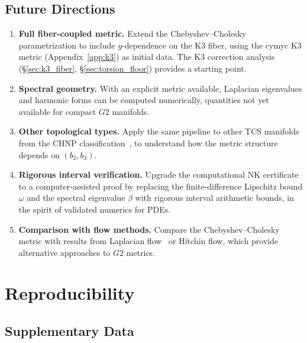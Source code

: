 \documentclass[11pt,a4paper]{article}
\newcommand{\Gtwo}{\mathrm{G}_2}
\theoremstyle{remark}
\def\Gtwo{G2}%
\begin{document}
\subsection{Future Directions}\label{sec:future}

\begin{enumerate}
    \item \textbf{Full fiber-coupled metric.} Extend the Chebyshev--Cholesky parametrization to
          include $y$-dependence on the K3 fiber, using the cymyc K3 metric (Appendix~\ref{app:k3}) as
          initial data. The K3 correction analysis (\S\ref{sec:k3_fiber}, \S\ref{sec:torsion_floor}) provides a starting point.

    \item \textbf{Spectral geometry.} With an explicit metric available, Laplacian eigenvalues and
          harmonic forms can be computed numerically, quantities not yet available for
          compact $\Gtwo$ manifolds.

    \item \textbf{Other topological types.} Apply the same pipeline to other TCS manifolds from the
          CHNP classification~\cite{chnp2015}, to understand how the metric structure depends on $(b_2, b_3)$.

    \item \textbf{Rigorous interval verification.} Upgrade the computational NK certificate to a
          computer-assisted proof by replacing the finite-difference Lipschitz bound $\omega$ and
          the spectral eigenvalue $\beta$ with rigorous interval arithmetic bounds, in the spirit
          of validated numerics for PDEs.

    \item \textbf{Comparison with flow methods.} Compare the Chebyshev--Cholesky metric with results
          from Laplacian flow~\cite{lotay2019} or Hitchin flow, which provide alternative approaches to $\Gtwo$
          metrics.
\end{enumerate}

\section{Reproducibility}\label{sec:reproducibility}

\subsection{Supplementary Data}\label{sec:supp_data}
\end{document}
